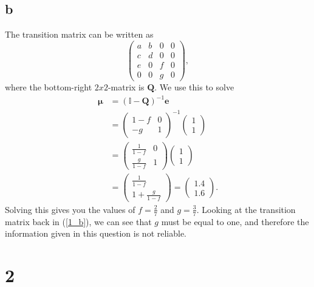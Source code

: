 \documentclass{article}
\begin{document}
\subsection{b}
The transition matrix can be written as
\begin{equation}
    \begin{pmatrix}
        a & b & 0 & 0 \\
        c & d & 0 & 0 \\
        e & 0 & f & 0 \\
        0 & 0 & g & 0 
    \end{pmatrix},\label{1_b}
\end{equation}
where the bottom-right $2x2$-matrix is $\mathbf{Q}$. We use this to solve 
\begin{align}
    \mathbf{\mu} &= (\mathbb{I} - \mathbf{Q})^{-1}\mathbf{e} \\
     &= \begin{pmatrix}
         1-f & 0 \\
         -g & 1
     \end{pmatrix}^{-1}\begin{pmatrix}
         1 \\ 1
     \end{pmatrix}\\
    &= \begin{pmatrix}
        \frac{1}{1-f} & 0 \\
        \frac{g}{1-f} & 1
    \end{pmatrix}\begin{pmatrix}
        1 \\ 1
    \end{pmatrix} \\
    &= \begin{pmatrix}
        \frac{1}{1-f} \\ 1+\frac{g}{1-f}     
    \end{pmatrix}= \begin{pmatrix}
        1.4 \\ 1.6
    \end{pmatrix}.
\end{align}
Solving this gives you the values of $f=\frac{2}{7}$ and $g=\frac{3}{7}$. Looking at the transition matrix back in (\ref{1_b}), we can see that $g$ must be equal to one, and therefore the information given in this question is not reliable.

\section{2}
\end{document}
